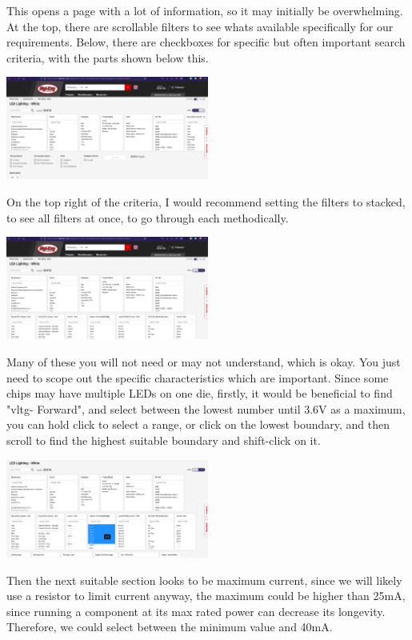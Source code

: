 \documentclass[a4paper,11pt]{report}
\begin{document}
This opens a page with a lot of information, so it may initially be overwhelming. At the top, there are scrollable filters to see whats available specifically for our requirements. Below, there are checkboxes for specific but often important search criteria, with the parts shown below this.

\includegraphics[width=0.5\textwidth]{screenshots/DigiKeyWhiteLEDPage}

On the top right of the criteria, I would recommend setting the filters to stacked, to see all filters at once, to go through each methodically.

\includegraphics[width=0.5\textwidth]{screenshots/DigiKeyWhiteLEDPageStacked}

Many of these you will not need or may not understand, which is okay. You just need to scope out the specific characteristics which are important. Since some chips may have multiple LEDs on one die, firstly, it would be beneficial to find "\gls{vltg}- Forward", and select between the lowest number until 3.6V as a maximum, you can hold click to select a range, or click on the lowest boundary, and then scroll to find the highest suitable boundary and shift-click on it.

\includegraphics[width=0.5\textwidth]{screenshots/DigiKeyWhiteLEDPageVoltage}

Then the next suitable section looks to be maximum current, since we will likely use a resistor to limit current anyway, the maximum could be higher than 25mA, since running a component at its max rated power can decrease its longevity. Therefore, we could select between the minimum value and 40mA.
\end{document}
